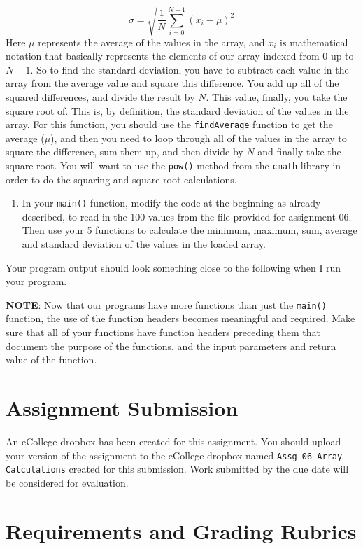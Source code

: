 \documentclass[11pt]{article}
\begin{document}
$$
\sigma = \sqrt{\frac{1}{N} \sum_{i=0}^{N-1} (x_i - \mu)^2}
$$
   Here $\mu$ represents the average of the values in the array, and $x_i$ is
   mathematical notation that basically represents the elements of our array
   indexed from $0$ up to $N-1$.  So to find the standard deviation, you
   have to subtract each value in the array from the average value and
   square this difference.  You add up all of the squared differences, and
   divide the result by $N$.  This value, finally, you take the
   square root of.  This is, by definition, the standard deviation
   of the values in the array.  For this function, you should use the
   \verb~findAverage~ function to get the average ($\mu$), and then
   you need to loop through all of the values in the array to 
   square the difference, sum them up, and then divide by $N$ and
   finally take the square root.  You will want to use the \verb~pow()~
   method from the \verb~cmath~ library in order to do the squaring and
   square root calculations.

\begin{enumerate}
\item In your \verb~main()~ function, modify the code at the beginning
as already described, to read in the 100 values from the
file provided for assignment 06.  Then use your 5 functions to calculate
the minimum, maximum, sum, average and standard deviation of the values
in the loaded array.
\end{enumerate}

Your program output should look something close to the following when I
run your program. 

\textbf{NOTE}: Now that our programs have more functions than just the
\verb~main()~ function, the use of the function headers becomes meaningful
and required.  Make sure that all of your functions have function
headers preceding them that document the purpose of the functions, and
the input parameters and return value of the function.
\section*{Assignment Submission}
\label{sec-4}

An eCollege dropbox has been created for this assignment.  You should
upload your version of the assignment to the eCollege dropbox named
\verb~Assg 06 Array Calculations~ created for this submission.  Work
submitted by the due date will be considered for evaluation.
\section*{Requirements and Grading Rubrics}
\label{sec-5}
\end{document}
